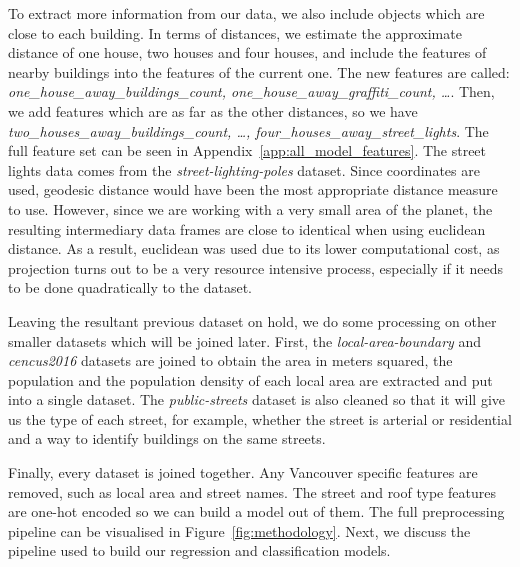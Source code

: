 To extract more information from our data, we also include objects which are close to each building. In terms of distances, we estimate the approximate distance of one house, two houses and four houses, and include the features of nearby buildings into the features of the current one. The new features are called: \textit{one\_house\_away\_buildings\_count, one\_house\_away\_graffiti\_count, \ldots}. Then, we add features which are as far as the other distances, so we have \textit{two\_houses\_away\_buildings\_count, \ldots, four\_houses\_away\_street\_lights}. The full feature set can be seen in Appendix~\ref{app:all_model_features}. The street lights data comes from the \textit{street-lighting-poles} dataset. Since coordinates are used, geodesic distance would have been the most appropriate distance measure to use. However, since we are working with a very small area of the planet, the resulting intermediary data frames are close to identical when using euclidean distance. As a result, euclidean was used due to its lower computational cost, as projection turns out to be a very resource intensive process, especially if it needs to be done quadratically to the dataset.

Leaving the resultant previous dataset on hold, we do some processing on other smaller datasets which will be joined later. First, the \textit{local-area-boundary} and \textit{cencus2016} datasets are joined to obtain the area in meters squared, the population and the population density of each local area are extracted and put into a single dataset. The \textit{public-streets} dataset is also cleaned so that it will give us the type of each street, for example, whether the street is arterial or residential and a way to identify buildings on the same streets.

Finally, every dataset is joined together. Any Vancouver specific features are removed, such as local area and street names. The street and roof type features are one-hot encoded so we can build a model out of them. The full preprocessing pipeline can be visualised in Figure~\ref{fig:methodology}. Next, we discuss the pipeline used to build our regression and classification models.

